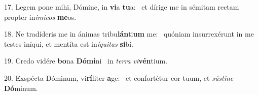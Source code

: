 17. Legem pone mihi, Dómine, in \textbf{vi}a \textbf{tu}a: \ast\  et dírige me in sémitam rectam propter in\textit{i}\textit{mí}\textit{cos} \textbf{me}os.\

18. Ne tradíderis me in ánimas tribu\textbf{lán}ti\textbf{um} me: \ast\  quóniam insurrexérunt in me testes iníqui, et mentíta est in\textit{í}\textit{qui}\textit{tas} \textbf{si}bi.\

19. Credo vidére \textbf{bo}na \textbf{Dó}\textbf{mi}ni \ast\  in \textit{ter}\textit{ra} \textit{vi}\textbf{vén}tium.\

20. Exspécta Dóminum, vi\textbf{rí}liter \textbf{a}ge: \ast\  et confortétur cor tuum, et \textit{sús}\textit{ti}\textit{ne} \textbf{Dó}minum.\


